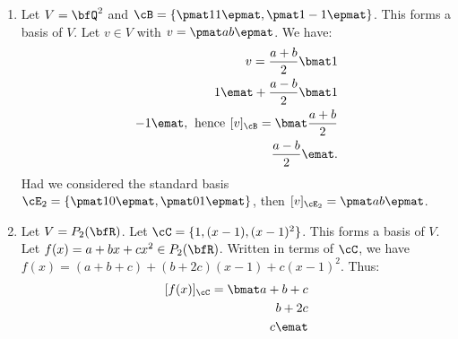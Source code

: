    
    \begin{example}
        \phantom{a}
        \begin{enumerate}[label = (\arabic*)]
            \item Let $V = \bfQ^2$ and $\cB = \{\pmat 1 \\ 1 \epmat, \pmat 1 \\ -1 \epmat \}$. This forms a basis of $V$. Let $v \in V$ with $v = \pmat a \\ b \epmat$. We have:
            \begin{equation*}
            \begin{split}
                v = \frac{a+b}{2} \bmat 1 \\ 1 \emat + \frac{a-b}{2} \bmat 1 \\ -1 \emat, \hspace{4pt} \text{hence} \hspace{4pt} [v]_\cB = \bmat \frac{a+b}{2} \\ \frac{a-b}{2} \emat.
            \end{split}
            \end{equation*}
            Had we considered the standard basis $\cE_2 = \{\pmat 1 \\ 0 \epmat , \pmat 0 \\ 1 \epmat \}$, then $[v]_{\cE_2} = \pmat a \\ b \epmat$.

            \item Let $V = P_2(\bfR)$. Let $\cC = \{1, (x-1), (x-1)^2 \}$. This forms a basis of $V$. Let $f(x) = a + bx + cx^2 \in P_2(\bfR)$. Written in terms of $\cC$, we have $f(x) = (a + b + c) + (b+2c)(x-1) + c(x-1)^2$. Thus:
                \begin{equation*}
                \begin{split}
                    [f(x)]_\cC = \bmat a+b+c \\ b+2c \\ c \emat
                \end{split}
                \end{equation*}
        \end{enumerate}
    \end{example}

